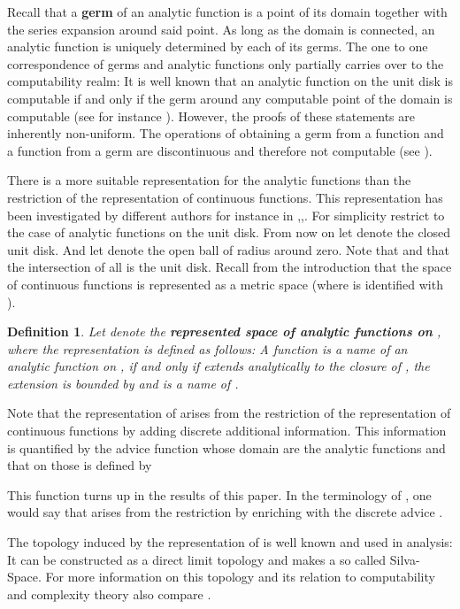 \documentclass{eptcs-modified}
\newtheorem{definition}[theorem]{Definition}
\newcommand{\demph}{\textbf}
\begin{document}
			Recall that a \demph{germ} of an analytic function is a point of its domain together with the series expansion around said point.
			As long as the domain is connected, an analytic function is uniquely determined by each of its germs.
			The one to one correspondence of germs and analytic functions only partially carries over to the computability realm:
			It is well known that an analytic function on the unit disk is computable if and only if the germ around any computable point of the domain is computable (see for instance \cite{MR1137517}).
			However, the proofs of these statements are inherently non-uniform.
			The operations of obtaining a germ from a function and a function from a germ are discontinuous and therefore not computable (see \cite{Muller1995}).

			There is a more suitable representation for the analytic functions than the restriction of the representation of continuous functions.
			This representation has been investigated by different authors for instance in \cite{MR3377508},\cite{MR2207129},\cite{Muller1995}.
			For simplicity restrict to the case of analytic functions on the unit disk.
			From now on let  denote the closed unit disk.
			And let  denote the open ball   of radius  around zero.
			Note that  and that the intersection of all  is the unit disk.
			Recall from the introduction that the space  of continuous functions is represented as a metric space (where  is identified with ).
			\begin{definition}\label{def:analytic rep}
				Let  denote the \demph{represented space of analytic functions on }, where the representation is defined as follows:
				A function  is a name of an analytic function  on , if and only if  extends analytically to the closure of , the extension is bounded by  and  is a name of .
			\end{definition}

			Note that the representation of  arises from the restriction of the representation of continuous functions by adding discrete additional information.
			This information is quantified by the advice function  whose domain are the analytic functions and that on those is defined by
			
			This function turns up in the results of this paper.
			In the terminology of \cite{MR3377508}, one would say that  arises from the restriction  by enriching with the discrete advice .

			The topology induced by the representation of  is well known and used in analysis:
			It can be constructed as a direct limit topology and makes  a so called Silva-Space.
			For more information on this topology and its relation to computability and complexity theory also compare \cite{MR2207129}.
\end{document}
